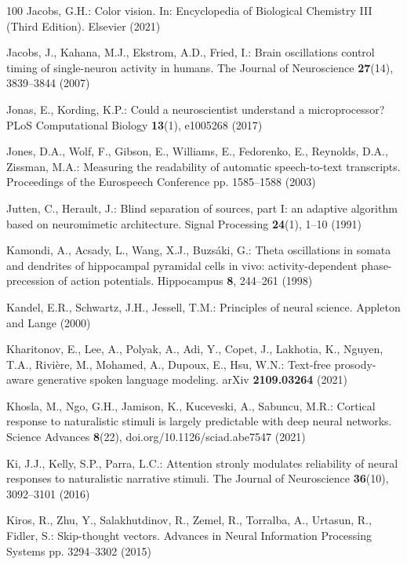 \documentclass[runningheads]{llncs}
\begin{document}
\begin{thebibliography}{100}
Jacobs, G.H.: Color vision. In: Encyclopedia of Biological Chemistry {III}
  {({Third} Edition}). Elsevier (2021)

Jacobs, J., Kahana, M.J., Ekstrom, A.D., Fried, I.: Brain oscillations control
  timing of single-neuron activity in humans. The Journal of Neuroscience
  \textbf{27}(14),  3839--3844 (2007)

Jonas, E., Kording, K.P.: Could a neuroscientist understand a microprocessor?
  {PLoS} Computational Biology  \textbf{13}(1),  e1005268 (2017)

Jones, D.A., Wolf, F., Gibson, E., Williams, E., Fedorenko, E., Reynolds, D.A.,
  Zissman, M.A.: Measuring the readability of automatic speech-to-text
  transcripts. Proceedings of the Eurospeech Conference pp. 1585--1588 (2003)

Jutten, C., Herault, J.: Blind separation of sources, part {I}: an adaptive
  algorithm based on neuromimetic architecture. Signal Processing
  \textbf{24}(1),  1--10 (1991)

Kamondi, A., Acsady, L., Wang, X.J., Buzs\'aki, G.: Theta oscillations in
  somata and dendrites of hippocampal pyramidal cells in vivo:
  activity-dependent phase-precession of action potentials. Hippocampus
  \textbf{8},  244--261 (1998)

Kandel, E.R., Schwartz, J.H., Jessell, T.M.: Principles of neural science.
  Appleton and Lange (2000)

Kharitonov, E., Lee, A., Polyak, A., Adi, Y., Copet, J., Lakhotia, K., Nguyen,
  T.A., Rivi{\`e}re, M., Mohamed, A., Dupoux, E., Hsu, W.N.: Text-free
  prosody-aware generative spoken language modeling. {arXiv}
  \textbf{2109.03264} (2021)

Khosla, M., Ngo, G.H., Jamison, K., Kuceveski, A., Sabuncu, M.R.: Cortical
  response to naturalistic stimuli is largely predictable with deep neural
  networks. Science Advances  \textbf{8}(22),  doi.org/10.1126/sciad.abe7547
  (2021)

Ki, J.J., Kelly, S.P., Parra, L.C.: Attention stronly modulates reliability of
  neural responses to naturalistic narrative stimuli. The Journal of
  Neuroscience  \textbf{36}(10),  3092--3101 (2016)

Kiros, R., Zhu, Y., Salakhutdinov, R., Zemel, R., Torralba, A., Urtasun, R.,
  Fidler, S.: Skip-thought vectors. Advances in Neural Information Processing
  Systems pp. 3294--3302 (2015)


\end{thebibliography}
\end{document}
